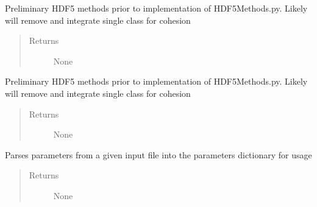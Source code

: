 \documentclass[letterpaper,10pt,english]{sphinxmanual}
\begin{document}
\begin{fulllineitems}
\begin{fulllineitems}
\begin{quote}
\begin{description}
\end{description}\end{quote}

\end{fulllineitems}


\begin{fulllineitems}
\label{\detokenize{index:droogCNC.TwoAxisStage.__createGroup}}
\sphinxAtStartPar
Preliminary HDF5 methods prior to implementation of HDF5Methods.py. Likely will remove and integrate single
class for cohesion
\begin{quote}\begin{description}
\item[{Returns}] \leavevmode
\sphinxAtStartPar
None

\end{description}\end{quote}

\end{fulllineitems}


\begin{fulllineitems}
\label{\detokenize{index:droogCNC.TwoAxisStage.__parseMetadataFile}}
\sphinxAtStartPar
Preliminary HDF5 methods prior to implementation of HDF5Methods.py. Likely will remove and integrate single
class for cohesion
\begin{quote}\begin{description}
\item[{Returns}] \leavevmode
\sphinxAtStartPar
None

\end{description}\end{quote}

\end{fulllineitems}


\begin{fulllineitems}
\label{\detokenize{index:droogCNC.TwoAxisStage.__parseParameters}}
\sphinxAtStartPar
Parses parameters from a given input file into the parameters dictionary for usage
\begin{quote}\begin{description}
\item[{Returns}] \leavevmode
\sphinxAtStartPar
None


\end{description}
\end{quote}
\end{fulllineitems}
\end{fulllineitems}
\end{document}

